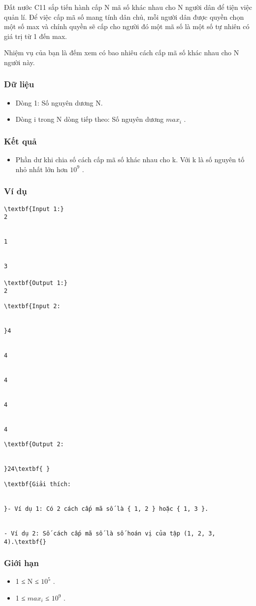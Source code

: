 



   Đất nước C11 sắp tiến hành cấp N mã số khác nhau cho N người dân để tiện việc quản lí. Để việc cấp mã số mang tính dân chủ, mỗi người dân được quyền chọn một số max và chính quyền sẽ cấp cho người đó một mã số là một số tự nhiên có giá trị từ 1 đến max.  

   Nhiệm vụ của bạn là đếm xem có bao nhiêu cách cấp mã số khác nhau cho N người này.  

\subsubsection{   Dữ liệu  }
\begin{itemize}
	\item     Dòng 1: Số nguyên dương N.   
	\item     Dòng i trong N dòng tiếp theo: Số nguyên dương $max_{i}$    .   
\end{itemize}

\subsubsection{   Kết quả  }
\begin{itemize}
	\item     Phần dư khi chia số cách cấp mã số khác nhau cho k. Với k là số nguyên tố nhỏ nhất lớn hơn $10^{9}$    .   
\end{itemize}

\subsubsection{   Ví dụ  }
\begin{verbatim}
\textbf{Input 1:}
2


1


3

\textbf{Output 1:}
2\end{verbatim}
\begin{verbatim}
\textbf{Input 2:


}4


4


4


4


4 \end{verbatim}
\begin{verbatim}
\textbf{Output 2:


}24\textbf{ }\end{verbatim}
\begin{verbatim}
\textbf{Giải thích:


}- Ví dụ 1: Có 2 cách cấp mã số là { 1, 2 } hoặc { 1, 3 }.


- Ví dụ 2: Số cách cấp mã số là số hoán vị của tập (1, 2, 3, 4).\textbf{}\end{verbatim}

\subsubsection{   Giới hạn  }
\begin{itemize}
	\item     1 ≤ N ≤ $10^{5}$    .   
	\item     1 ≤ $max_{i}$    ≤ $10^{9}$    .   
\end{itemize}
